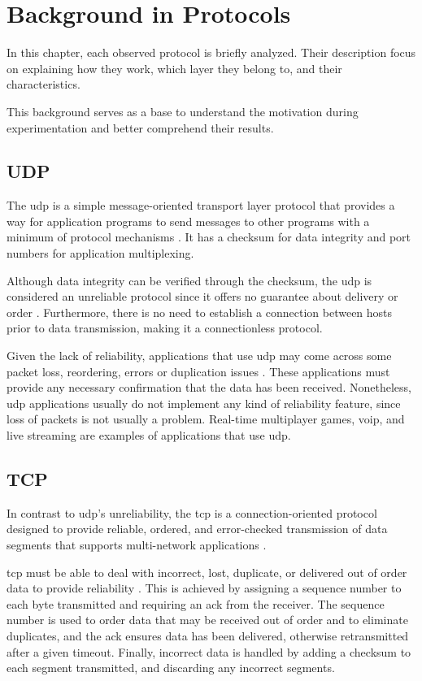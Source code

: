 \section{Background in Protocols}

In this chapter, each observed protocol is briefly analyzed. Their description focus on explaining how they work, which layer they belong to, and their characteristics. 

This background serves as a base to understand the motivation during experimentation and better comprehend their results.

\subsection{UDP}

The \gls{udp} is a simple message-oriented transport layer protocol that provides a way for application programs to send messages to other programs with a minimum of protocol mechanisms \cite{rfc768}. It has a checksum for data integrity and port numbers for application multiplexing.

Although data integrity can be verified through the checksum, the \gls{udp} is considered an unreliable protocol since it offers no guarantee about delivery or order \cite{data_networks_ip}. Furthermore, there is no need to establish a connection between hosts prior to data transmission, making it a connectionless protocol.

Given the lack of reliability, applications that use \gls{udp} may come across some packet loss, reordering, errors or duplication issues \cite{data_networks_ip}. These applications must provide any necessary confirmation that the data has been received. Nonetheless, \gls{udp} applications usually do not implement any kind of reliability feature, since loss of packets is not usually a problem. Real-time multiplayer games, \gls{voip}, and live streaming are examples of applications that use \gls{udp}.

\subsection{TCP}

In contrast to \gls{udp}’s unreliability, the \gls{tcp} is a connection-oriented protocol designed to provide reliable, ordered, and error-checked transmission of data segments that supports multi-network applications \cite{rfc793}.

\gls{tcp} must be able to deal with incorrect, lost, duplicate, or delivered out of order data to provide reliability \cite{rfc793}. This is achieved by assigning a sequence number to each byte transmitted and requiring an \gls{ack} from the receiver. The sequence number is used to order data that may be received out of order and to eliminate duplicates, and the \gls{ack} ensures data has been delivered, otherwise retransmitted after a given timeout. Finally, incorrect data is handled by adding a checksum to each segment transmitted, and discarding any incorrect segments.

